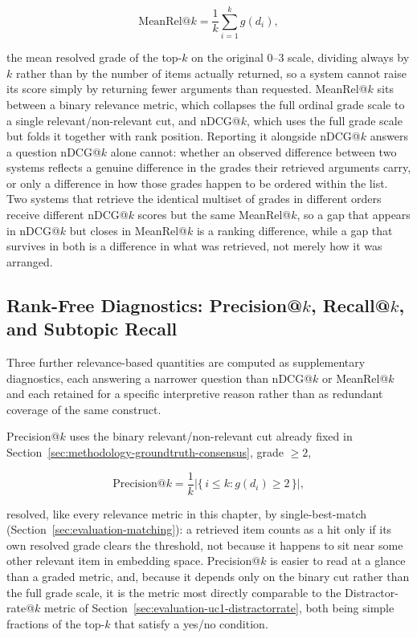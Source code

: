 \begin{equation}
\mathrm{MeanRel}@k = \frac{1}{k} \sum_{i=1}^{k} g(d_i),
\label{eq:evaluation-meanrel}
\end{equation}

\noindent the mean resolved grade of the top-$k$ on the original 0--3 scale, dividing always by
$k$ rather than by the number of items actually returned, so a system cannot raise its score simply
by returning fewer arguments than requested. MeanRel@$k$ sits between a binary relevance metric,
which collapses the full ordinal grade scale to a single relevant/non-relevant cut, and nDCG@$k$,
which uses the full grade scale but folds it together with rank position. Reporting it alongside
nDCG@$k$ answers a question nDCG@$k$ alone cannot: whether an observed difference between two
systems reflects a genuine difference in the grades their retrieved arguments carry, or only a
difference in how those grades happen to be ordered within the list. Two systems that retrieve the
identical multiset of grades in different orders receive different nDCG@$k$ scores but the same
MeanRel@$k$, so a gap that appears in nDCG@$k$ but closes in MeanRel@$k$ is a ranking difference,
while a gap that survives in both is a difference in what was retrieved, not merely how it was
arranged.

\subsection{Rank-Free Diagnostics: Precision@$k$, Recall@$k$, and Subtopic Recall}
\label{sec:evaluation-uc1-diagnostics}

Three further relevance-based quantities are computed as supplementary diagnostics, each answering
a narrower question than nDCG@$k$ or MeanRel@$k$ and each retained for a specific interpretive
reason rather than as redundant coverage of the same construct.

Precision@$k$ uses the binary relevant/non-relevant cut already fixed in
Section~\ref{sec:methodology-groundtruth-consensus}, grade $\geq 2$,

\begin{equation}
\mathrm{Precision}@k = \frac{1}{k} \left| \{\, i \leq k : g(d_i) \geq 2 \,\} \right|,
\label{eq:evaluation-precision}
\end{equation}

\noindent resolved, like every relevance metric in this chapter, by single-best-match
(Section~\ref{sec:evaluation-matching}): a retrieved item counts as a hit only if its own resolved
grade clears the threshold, not because it happens to sit near some other relevant item in
embedding space. Precision@$k$ is easier to read at a glance than a graded metric, and, because it
depends only on the binary cut rather than the full grade scale, it is the metric most directly
comparable to the Distractor-rate@$k$ metric of Section~\ref{sec:evaluation-uc1-distractorrate},
both being simple fractions of the top-$k$ that satisfy a yes/no condition.

